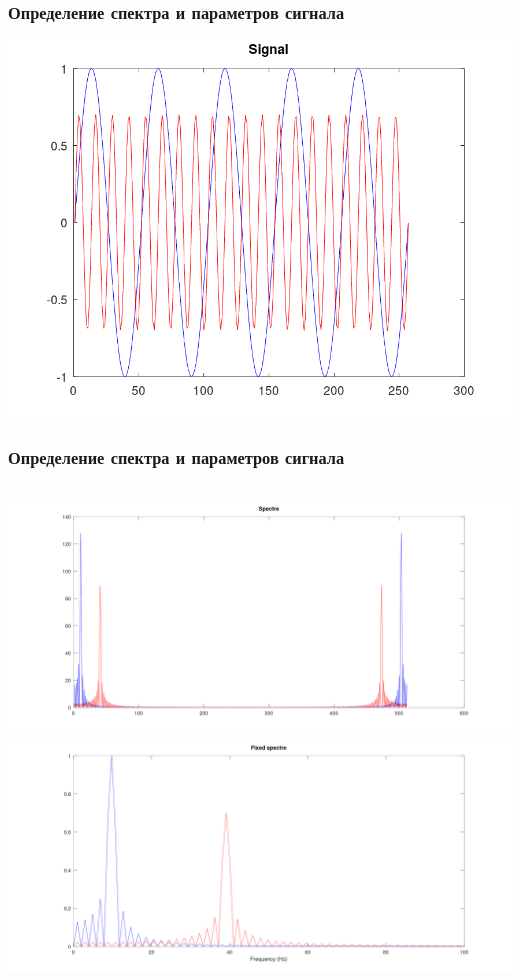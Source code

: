 \begin{frame}
\frametitle{Определение спектра и параметров сигнала}
            \includegraphics[width=\textwidth]{../octave/spectre1/signal/spectre.png}
\end{frame}

\begin{frame}
\frametitle{Определение спектра и параметров сигнала}
\begin{columns}
            \includegraphics[width=\textwidth]{../octave/spectre1/spectre/spectre.png}
            \includegraphics[width=\textwidth]{../octave/spectre1/spectre/spectre_fix.png}
\end{columns}
\end{frame}

